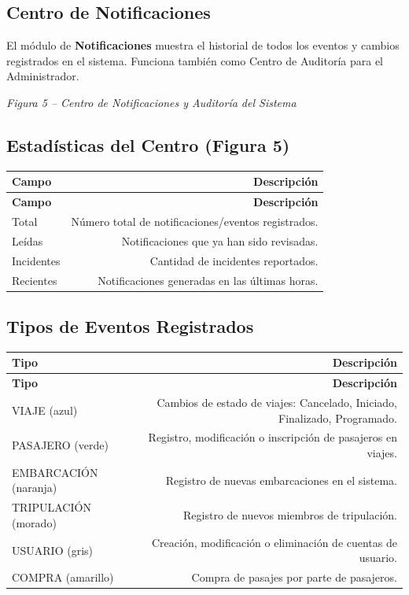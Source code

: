 \documentclass[12pt,a4paper]{article}
\begin{document}
\subsection{Centro de Notificaciones}

El módulo de \textbf{Notificaciones} muestra el historial de todos los eventos y cambios registrados en el sistema. Funciona también como Centro de Auditoría para el Administrador.

\textit{Figura 5 -- Centro de Notificaciones y Auditoría del Sistema}

\subsection{Estadísticas del Centro (Figura 5)}

\begin{longtable}{LR}
  \toprule
  \textbf{Campo} & \textbf{Descripción} \\
  \midrule
  \endfirsthead
  \toprule
  \textbf{Campo} & \textbf{Descripción} \\
  \midrule
  \endhead
  \bottomrule
  \endfoot
  Total     & Número total de notificaciones/eventos registrados. \\[4pt]
  Leídas    & Notificaciones que ya han sido revisadas. \\[4pt]
  Incidentes & Cantidad de incidentes reportados. \\[4pt]
  Recientes & Notificaciones generadas en las últimas horas. \\
\end{longtable}

\subsection{Tipos de Eventos Registrados}

\begin{longtable}{LR}
  \toprule
  \textbf{Tipo} & \textbf{Descripción} \\
  \midrule
  \endfirsthead
  \toprule
  \textbf{Tipo} & \textbf{Descripción} \\
  \midrule
  \endhead
  \bottomrule
  \endfoot
  VIAJE (azul)          & Cambios de estado de viajes: Cancelado, Iniciado, Finalizado, Programado. \\[4pt]
  PASAJERO (verde)      & Registro, modificación o inscripción de pasajeros en viajes. \\[4pt]
  EMBARCACIÓN (naranja) & Registro de nuevas embarcaciones en el sistema. \\[4pt]
  TRIPULACIÓN (morado)  & Registro de nuevos miembros de tripulación. \\[4pt]
  USUARIO (gris)        & Creación, modificación o eliminación de cuentas de usuario. \\[4pt]
  COMPRA (amarillo)     & Compra de pasajes por parte de pasajeros. \\
\end{longtable}
\end{document}

